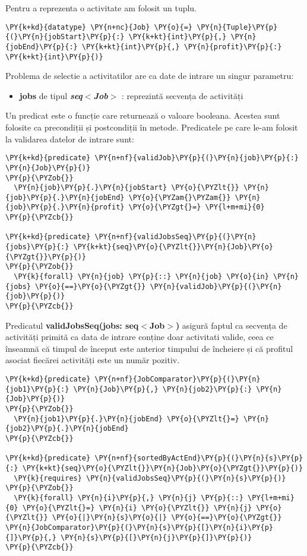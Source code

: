 Pentru a reprezenta o activitate am folosit un tuplu. 
\begin{Verbatim}[commandchars=\\\{\}, fontsize=\small]
\PY{k+kd}{datatype} \PY{n+nc}{Job} \PY{o}{=} \PY{n}{Tuple}\PY{p}{(}\PY{n}{jobStart}\PY{p}{:} \PY{k+kt}{int}\PY{p}{,} \PY{n}{jobEnd}\PY{p}{:} \PY{k+kt}{int}\PY{p}{,} \PY{n}{profit}\PY{p}{:} \PY{k+kt}{int}\PY{p}{)}
\end{Verbatim}
Problema de selectie a activitatilor are ca date de intrare un singur parametru:
\begin{itemize}
    \item \textbf{jobs} de tipul \textbf{\textit{seq$<$Job$>$}} : reprezintă secvența de activități 
\end{itemize}
Un predicat este o funcție care returnează o valoare booleana.\cite{DBLP:series/natosec/KoenigL12} Acestea sunt folosite ca precondiții și postcondiții în metode. Predicatele pe care le-am folosit la validarea datelor de intrare sunt:
\begin{Verbatim}[commandchars=\\\{\}, fontsize=\small]
\PY{k+kd}{predicate} \PY{n+nf}{validJob}\PY{p}{(}\PY{n}{job}\PY{p}{:} \PY{n}{Job}\PY{p}{)}
\PY{p}{\PYZob{}}
  \PY{n}{job}\PY{p}{.}\PY{n}{jobStart} \PY{o}{\PYZlt{}} \PY{n}{job}\PY{p}{.}\PY{n}{jobEnd} \PY{o}{\PYZam{}\PYZam{}} \PY{n}{job}\PY{p}{.}\PY{n}{profit} \PY{o}{\PYZgt{}=} \PY{l+m+mi}{0}
\PY{p}{\PYZcb{}}

\PY{k+kd}{predicate} \PY{n+nf}{validJobsSeq}\PY{p}{(}\PY{n}{jobs}\PY{p}{:} \PY{k+kt}{seq}\PY{o}{\PYZlt{}}\PY{n}{Job}\PY{o}{\PYZgt{}}\PY{p}{)}
\PY{p}{\PYZob{}}
  \PY{k}{forall} \PY{n}{job} \PY{p}{::} \PY{n}{job} \PY{o}{in} \PY{n}{jobs} \PY{o}{==}\PY{o}{\PYZgt{}} \PY{n}{validJob}\PY{p}{(}\PY{n}{job}\PY{p}{)}
\PY{p}{\PYZcb{}}
\end{Verbatim}
Predicatul \textbf{validJobsSeq(jobs: seq$<$Job$>$)} asigură faptul ca secvența de activități primită ca data de intrare conține doar activitati valide, ceea ce înseamnă că timpul de început este anterior timpului de încheiere și că profitul asociat fiecărei activități este un număr pozitiv.

\begin{Verbatim}[commandchars=\\\{\}, fontsize=\small]
\PY{k+kd}{predicate} \PY{n+nf}{JobComparator}\PY{p}{(}\PY{n}{job1}\PY{p}{:} \PY{n}{Job}\PY{p}{,} \PY{n}{job2}\PY{p}{:} \PY{n}{Job}\PY{p}{)}
\PY{p}{\PYZob{}}
  \PY{n}{job1}\PY{p}{.}\PY{n}{jobEnd} \PY{o}{\PYZlt{}=} \PY{n}{job2}\PY{p}{.}\PY{n}{jobEnd}
\PY{p}{\PYZcb{}}

\PY{k+kd}{predicate} \PY{n+nf}{sortedByActEnd}\PY{p}{(}\PY{n}{s}\PY{p}{:} \PY{k+kt}{seq}\PY{o}{\PYZlt{}}\PY{n}{Job}\PY{o}{\PYZgt{}}\PY{p}{)}
  \PY{k}{requires} \PY{n}{validJobsSeq}\PY{p}{(}\PY{n}{s}\PY{p}{)}
\PY{p}{\PYZob{}}
  \PY{k}{forall} \PY{n}{i}\PY{p}{,} \PY{n}{j} \PY{p}{::} \PY{l+m+mi}{0} \PY{o}{\PYZlt{}=} \PY{n}{i} \PY{o}{\PYZlt{}} \PY{n}{j} \PY{o}{\PYZlt{}} \PY{o}{|}\PY{n}{s}\PY{o}{|} \PY{o}{==}\PY{o}{\PYZgt{}} \PY{n}{JobComparator}\PY{p}{(}\PY{n}{s}\PY{p}{[}\PY{n}{i}\PY{p}{]}\PY{p}{,} \PY{n}{s}\PY{p}{[}\PY{n}{j}\PY{p}{]}\PY{p}{)}
\PY{p}{\PYZcb{}}
\end{Verbatim}

